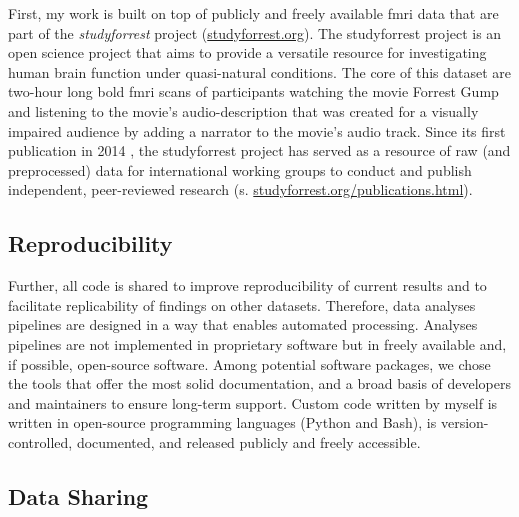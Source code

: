 First, my work is built on top of publicly and freely available \ac{fmri} data
that are part of the \textit{studyforrest} project
(\href{www.studyforrest.org}{\url{studyforrest.org}}).
%
The studyforrest project is an open science project that aims to provide a
versatile resource for investigating human brain function under quasi-natural
conditions.
The core of this dataset are two-hour long \ac{bold} \ac{fmri} scans of
participants watching the movie Forrest Gump \citep{ForrestGumpMovie} and
listening to the movie's audio-description that was created for a visually
impaired audience by adding a narrator to the movie's audio track.
Since its first publication in 2014 \citep{hanke2014audiomovie}, the
studyforrest project has served as a resource of raw (and preprocessed) data for
international working groups to conduct and publish independent, peer-reviewed
research (s.
\href{www.studyforrest.org/publications.html}{\url{studyforrest.org/publications.html}}).


\subsection{Reproducibility}

Further, all code is shared to improve reproducibility of current results and to
facilitate replicability of findings on other datasets.
Therefore, data analyses pipelines are designed in a way that enables automated
processing.
Analyses pipelines are not implemented in proprietary software but in freely
available and, if possible, open-source software.
Among potential software packages, we chose the tools that offer the most solid
documentation, and a broad basis of developers and maintainers to ensure
long-term support.
Custom code written by myself is written in open-source programming languages
(Python and Bash), is version-controlled, documented, and released publicly and
freely accessible.


\subsection{Data Sharing}

